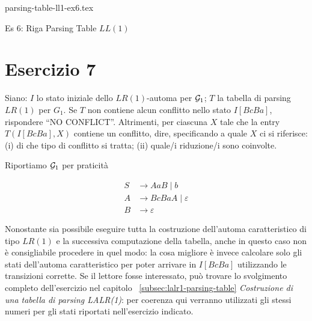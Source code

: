 \documentclass[class=book, crop=false, oneside, 12pt]{standalone}
\begin{document}
\begin{table}[H]
    \centering
    {parsing-table-ll1-ex6.tex}
    \caption{Es 6: Riga Parsing Table \(LL(1)\)}
    \label{tab:parsing-table-ll1-ex6}
\end{table}

\section*{Esercizio 7}

Siano: \(I\) lo stato iniziale dello \(LR(1)\)-automa per \(\mathcal{G}_1\); \(T\) la tabella di parsing \(LR(1)\) per \(G_1\).  Se \(T\) non contiene alcun conflitto nello stato \(I[BcBa]\), rispondere “NO CONFLICT”.  Altrimenti, per ciascuna \(X\) tale che la entry \(T(I[BcBa],X)\) contiene un conflitto, dire, specificando a quale \(X\) ci si riferisce:  (i) di che tipo di conflitto si tratta; (ii) quale/i riduzione/i sono coinvolte.

Riportiamo \(\mathcal{G}_1\) per praticità

\begin{align*}
    S &\to AaB \mid b \\
    A &\to BcBaA \mid \varepsilon \\
    B &\to \varepsilon
\end{align*}

Nonostante sia possibile eseguire tutta la costruzione dell'automa caratteristico di tipo \(LR(1)\) e la successiva computazione della tabella, anche in questo caso non è consigliabile procedere in quel modo: la cosa migliore è invece calcolare solo gli stati dell'automa caratteristico per poter arrivare in \(I[BcBa]\) utilizzando le transizioni corrette. Se il lettore fosse interessato, può trovare lo svolgimento completo dell'esercizio nel capitolo ~\ref{subsec:lalr1-parsing-table} \emph{Costruzione di una tabella di parsing LALR(1)}: per coerenza qui verranno utilizzati gli stessi numeri per gli stati riportati nell'esercizio indicato. 
\end{document}
